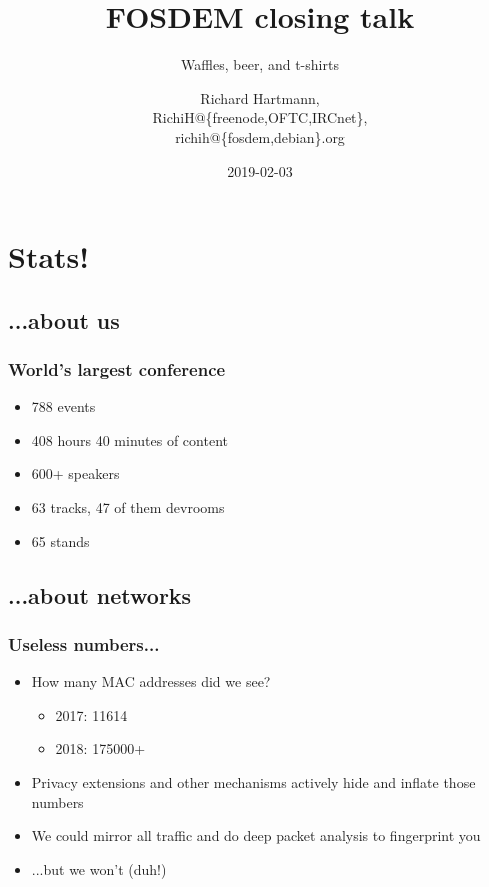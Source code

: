 \documentclass[aspectratio=169]{beamer}
\title{FOSDEM closing talk}
\subtitle{Waffles, beer, and t-shirts}
\author{Richard Hartmann,\\
RichiH@\{freenode,OFTC,IRCnet\},\\
richih@\{fosdem,debian\}.org}
\date{2019-02-03}
\begin{document}
\setcounter{tocdepth}{1}

\begin{frame}
	\titlepage
\end{frame}




\section{Stats!}

\subsection{...about us}

\begin{frame}
	\frametitle{World's largest conference}
	\vfill
	\begin{itemize}
		\item 788 events
		\item 408 hours 40 minutes of content
		\item 600+ speakers
		\item 63 tracks, 47 of them devrooms
		\item 65 stands
	\end{itemize}
	\vfill
\end{frame}

\subsection{...about networks}

\begin{frame}
	\frametitle{Useless numbers...}
	\vfill
	\begin{itemize}
		\item How many MAC addresses did we see?
		\begin{itemize}
			\item 2017: 11614
			\item 2018: 175000+
		\end{itemize}
		\item Privacy extensions and other mechanisms actively hide and inflate those numbers
		\item We could mirror all traffic and do deep packet analysis to fingerprint you
		\item ...but we won't (duh!)
	\end{itemize}
	\vfill
\end{frame}
\end{document}
